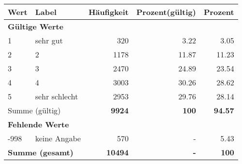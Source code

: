      \begin{longtable}{lXrrr}
     \toprule
     \textbf{Wert} & \textbf{Label} & \textbf{Häufigkeit} & \textbf{Prozent(gültig)} & \textbf{Prozent} \\
     \endhead
     \midrule
     \multicolumn{5}{l}{\textbf{Gültige Werte}}\\

     1 &
     \multicolumn{1}{X}{ sehr gut   } &


       \num{320} &
       \num[round-mode=places,round-precision=2]{3.22} &
         \num[round-mode=places,round-precision=2]{3.05} \\

     2 &
     \multicolumn{1}{X}{ 2   } &


       \num{1178} &
       \num[round-mode=places,round-precision=2]{11.87} &
         \num[round-mode=places,round-precision=2]{11.23} \\

     3 &
     \multicolumn{1}{X}{ 3   } &


       \num{2470} &
       \num[round-mode=places,round-precision=2]{24.89} &
         \num[round-mode=places,round-precision=2]{23.54} \\

     4 &
     \multicolumn{1}{X}{ 4   } &


       \num{3003} &
       \num[round-mode=places,round-precision=2]{30.26} &
         \num[round-mode=places,round-precision=2]{28.62} \\

     5 &
     \multicolumn{1}{X}{ sehr schlecht   } &


       \num{2953} &
       \num[round-mode=places,round-precision=2]{29.76} &
         \num[round-mode=places,round-precision=2]{28.14} \\
     \midrule
     \multicolumn{2}{l}{Summe (gültig)} &
       \textbf{\num{9924}} &
     \textbf{\num{100}} &
       \textbf{\num[round-mode=places,round-precision=2]{94.57}} \\
     \multicolumn{5}{l}{\textbf{Fehlende Werte}}\\
       -998 &
       keine Angabe &
         \num{570} &
        - &
         \num[round-mode=places,round-precision=2]{5.43} \\
     \midrule
     \multicolumn{2}{l}{\textbf{Summe (gesamt)}} &
          \textbf{\num{10494}} &
        \textbf{-} &
        \textbf{\num{100}} \\
     \bottomrule
     \end{longtable}
     
